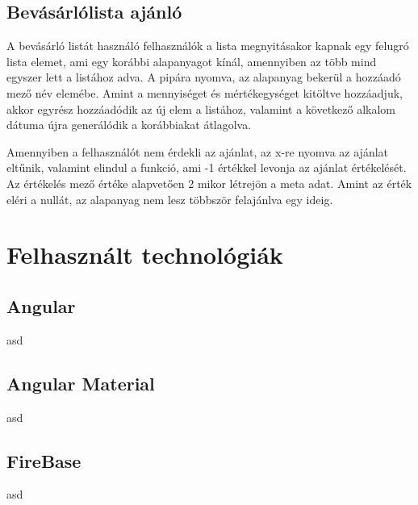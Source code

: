 \documentclass[12pt]{report}
\theoremstyle{definition}
\begin{document}
\section{Bevásárlólista ajánló}
A bevásárló listát használó felhasználók a lista megnyitásakor kapnak egy felugró lista elemet, ami egy korábbi alapanyagot kínál, amennyiben az több mind egyszer lett a listához adva. A pipára nyomva, az alapanyag bekerül a hozzáadó mező név elemébe. Amint a mennyiséget és mértékegységet kitöltve hozzáadjuk, akkor egyrész hozzáadódik az új elem a listához, valamint a következő alkalom dátuma újra generálódik a korábbiakat átlagolva.

Amennyiben a felhasználót nem érdekli az ajánlat, az x-re nyomva az ajánlat eltűnik, valamint elindul a funkció, ami -1 értékkel levonja az ajánlat értékelését. Az értékelés mező értéke alapvetően 2 mikor létrejön a meta adat. Amint az érték eléri a nullát, az alapanyag nem lesz többször felajánlva egy ideig.

	{\color{green}{
			\verb!Lehet, hogy ez már specifikáció inkább...!\\
			Annak érdekében, hogy ha a felhasználó egy ideig elvetette az alapanyagot, de egy idő után az mégis sokszor újra bekerül a listába, akkor minden hozzátételnél az értékelés mező +0.1 értékkel nő, ami lehetővé teszi, hogy egy idő után visszakerüljön az ajánlottak közé.

			Az ajánlás egy sima adatbázis lekérdezés, ami szűrve van úgy, hogy csak ez a pillanat előtti “ajánlott időpont”-os alapanyagokat kérdezzünk le, ami rendezve van dátum és értékelés csökkenő sorrendjében. Végűl a lekérdezés limitálva van három elemre.
		}}

\chapter{Felhasznált technológiák}
\section{Angular}
asd

\section{Angular Material}
asd

\section{FireBase}
asd
\end{document}
